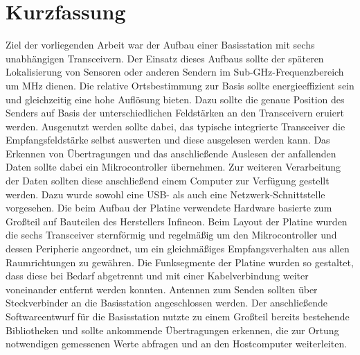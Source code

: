 
\chapter*{Kurzfassung}
\label{sec:kurzfassung}
\pagestyle{scrheadings}

Ziel der vorliegenden Arbeit war der Aufbau einer Basisstation mit sechs unabhängigen Transceivern. Der Einsatz dieses Aufbaus sollte der späteren Lokalisierung von Sensoren oder anderen Sendern im Sub-GHz-Frequenzbereich um \unit[868]{MHz} dienen. Die relative Ortsbestimmung zur Basis sollte energieeffizient sein und gleichzeitig eine hohe Auflösung bieten. 
Dazu sollte die genaue Position des Senders auf Basis der unterschiedlichen Feldstärken an den Transceivern eruiert werden. Ausgenutzt werden sollte dabei, das typische integrierte Transceiver die Empfangsfeldstärke selbst auswerten und diese ausgelesen werden kann. Das Erkennen von Übertragungen und das anschließende Auslesen der anfallenden Daten sollte dabei ein Mikrocontroller übernehmen. Zur weiteren Verarbeitung der Daten sollten diese anschließend einem Computer zur Verfügung gestellt werden. Dazu wurde sowohl eine USB- als auch eine Netzwerk-Schnittstelle vorgesehen. Die beim Aufbau der Platine verwendete Hardware basierte zum Großteil auf Bauteilen des Herstellers Infineon. 
Beim Layout der Platine wurden die sechs Transceiver sternförmig und regelmäßig um den Mikrocontroller und dessen Peripherie angeordnet, um ein gleichmäßiges Empfangsverhalten aus allen Raumrichtungen zu gewähren. Die Funksegmente der Platine wurden so gestaltet, dass diese bei Bedarf abgetrennt und mit einer Kabelverbindung weiter voneinander entfernt werden konnten. Antennen zum Senden sollten über Steckverbinder an die Basisstation angeschlossen werden.
Der anschließende Softwareentwurf für die Basisstation nutzte zu einem Großteil bereits bestehende Bibliotheken und sollte ankommende Übertragungen erkennen, die zur Ortung notwendigen gemessenen Werte abfragen und an den Hostcomputer weiterleiten. 


